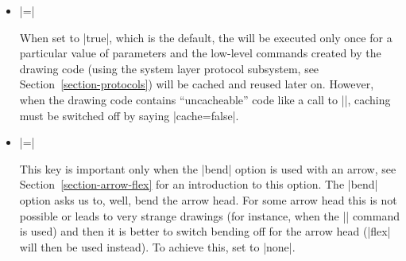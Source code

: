 \begin{command}{\pgfdeclarearrow{}}
\begin{itemize}
            The are some special considerations concerning the :
            \begin{itemize}
                \item In the  you may \emph{not} use |\pgfusepath|
                    since this would try to add arrow tips to the arrow tip and
                    lead to a recursion. Use the ``quick'' versions
                    |\pgfusepathqstroke| and so on instead, which never try to
                    add arrow tips.
                \item If you stroke the path that you construct, you should
                    first set the dashing to solid and set up fixed joins and
                    caps, as needed. This will ensure that the arrow tip will
                    always look the same.
                \item When the arrow tip code is executed, it is automatically
                    put inside a low-level scope, so nothing will ``leak out''
                    from the scope.
                \item The high-level coordinate transformation matrix will be
                    set to the identity matrix when the code is executed for
                    the first time.
            \end{itemize}
        \item {}|=|

            When set to |true|, which is the default, the  will be
            executed only once for a particular value of parameters and the
            low-level commands created by the drawing code (using the system
            layer protocol subsystem, see Section~\ref{section-protocols}) will
            be cached and reused later on. However, when the drawing code
            contains ``uncacheable'' code like a call to |\pgftext|, caching
            must be switched off by saying |cache=false|.
        \item {}|=|

            This key is important only when the |bend| option is used with an
            arrow, see Section~\ref{section-arrow-flex} for an introduction to
            this option. The |bend| option asks us to, well, bend the arrow
            head. For some arrow head this is not possible or leads to very
            strange drawings (for instance, when the |\pgftext| command is
            used) and then it is better to switch bending off for the arrow
            head (|flex| will then be used instead). To achieve this, set
             to |none|.


\end{itemize}
\end{command}
